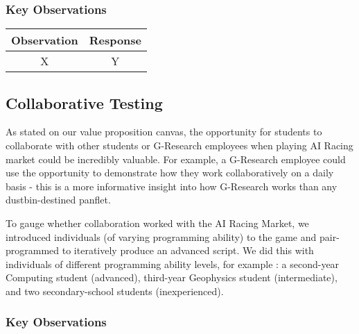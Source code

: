 \subsubsection{Key Observations}

\begin{tabular}{| c | c |}
\hline
Observation & Response \\
\hline\hline
X & Y \\
\hline
\end{tabular}

\subsection{Collaborative Testing}

As stated on our value proposition canvas, the opportunity for students to collaborate with other students or G-Research employees when playing AI Racing market could be incredibly valuable. For example, a G-Research employee could use the opportunity to demonstrate how they work collaboratively on a daily basis - this is a more informative insight into how G-Research works than any dustbin-destined panflet.

To gauge whether collaboration worked with the AI Racing Market, we introduced individuals (of varying programming ability) to the game and pair-programmed to iteratively produce an advanced script. We did this with individuals of different programming ability levels, for example : a second-year Computing student (advanced), third-year Geophysics student (intermediate), and two secondary-school students (inexperienced). 

\subsubsection{Key Observations}

